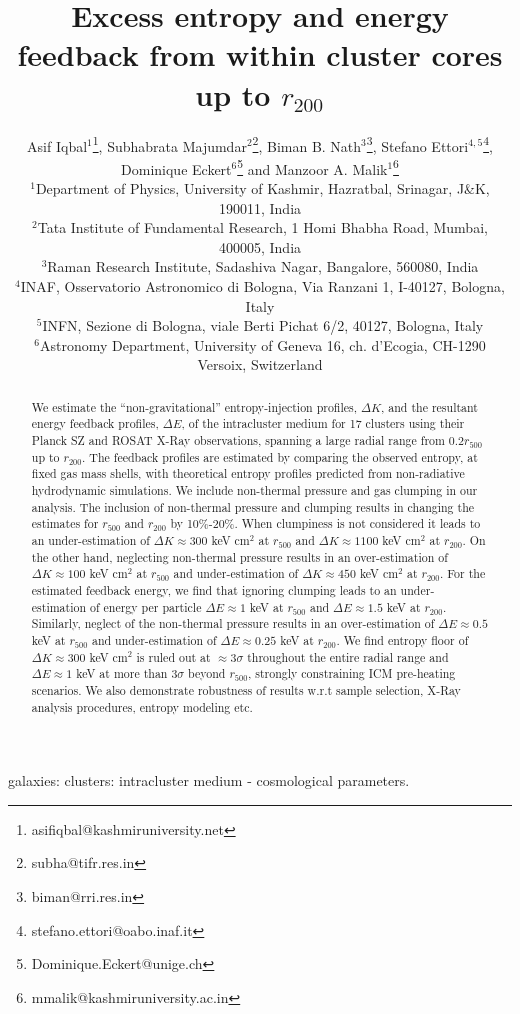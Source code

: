 \documentclass[a4paper,fleqn,usenatbib]{mnras}
\title[Non-gravitational feedback in galaxy clusters] 
{Excess entropy and energy feedback from within cluster cores up to $r_{200}$}
\author[Iqbal et~al.]
{Asif Iqbal$^{1}$\thanks{
asifiqbal@kashmiruniversity.net}, Subhabrata Majumdar$^{2}$\thanks{
subha@tifr.res.in}, Biman B. Nath$^{3}$\thanks{
biman@rri.res.in}, Stefano Ettori$^{4,5}$\thanks{stefano.ettori@oabo.inaf.it}, 
\newauthor Dominique Eckert$^{6}$\thanks{Dominique.Eckert@unige.ch} and Manzoor A. Malik$^{1}$\thanks{
mmalik@kashmiruniversity.ac.in}\\
  $^{1}$Department of Physics, University of Kashmir, Hazratbal, Srinagar, J\&K, 190011, India \\
  $^{2}$Tata Institute of Fundamental Research, 1 Homi Bhabha Road, Mumbai, 400005, India\\
  $^{3}$Raman Research Institute, Sadashiva Nagar, Bangalore, 560080, India\\
  $^{4}$INAF, Osservatorio Astronomico di Bologna, Via Ranzani 1, I-40127, Bologna, Italy \\
  $^{5}$INFN, Sezione di Bologna, viale Berti Pichat 6/2, 40127, Bologna, Italy\\
  $^{6}$Astronomy Department, University of Geneva 16, ch. d'Ecogia, CH-1290 Versoix, Switzerland
}
\date{}
\begin{document}
\maketitle
 
\begin{abstract}
We estimate the ``non-gravitational'' entropy-injection profiles, $\Delta K$, and the resultant energy feedback profiles, $\Delta E$, of the intracluster medium for 17 clusters using their Planck SZ  and ROSAT X-Ray observations, spanning a large radial range from $0.2r_{500}$ up to $r_{200}$.  The feedback profiles are estimated by comparing the observed entropy, at fixed gas mass shells, with theoretical entropy profiles predicted from non-radiative hydrodynamic simulations. We include non-thermal pressure and gas clumping in our analysis. The inclusion of non-thermal pressure and clumping  results in changing the estimates for $r_{500}$ and $r_{200}$ by 10\%-20\%. When clumpiness is not considered it leads to an under-estimation of $\Delta K\approx300$ keV cm$^2$ at $r_{500}$ and $\Delta K\approx1100$ keV cm$^2$ at $r_{200}$. On the other hand, neglecting non-thermal pressure results in an over-estimation of $\Delta K\approx 100$ keV cm$^2$ at $r_{500}$ and under-estimation of $\Delta K\approx450$ keV cm$^2$ at $r_{200}$. For the estimated feedback energy, we find that ignoring clumping leads to an under-estimation of  energy per particle $\Delta E\approx1$ keV at $r_{500}$ and $\Delta E\approx1.5$ keV at $r_{200}$. Similarly, neglect of the non-thermal pressure results in an over-estimation of  $\Delta E\approx0.5$ keV at $r_{500}$ and under-estimation of $\Delta E\approx0.25$ keV  at $r_{200}$.  We find entropy floor of $\Delta K\approx300$ keV cm$^2$ is ruled out at $\approx3\sigma$ throughout the entire radial range and  $\Delta E\approx1$ keV at more than 3$\sigma$ beyond $r_{500}$, strongly constraining ICM pre-heating scenarios.  We also demonstrate robustness of results w.r.t sample selection, X-Ray analysis procedures, entropy modeling etc. 
\end{abstract}
\begin{keywords}
 galaxies: clusters: intracluster medium - cosmological parameters.
\end{keywords}
\end{document}
